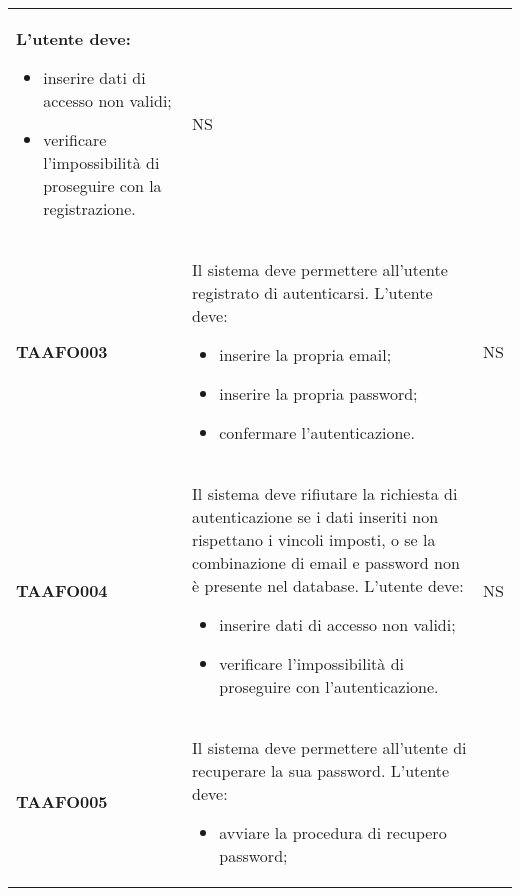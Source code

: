 \documentclass[../piano-di-qualifica.tex]{subfiles}
\begin{document}
\begin{longtable}[H]{>{\centering\bfseries}m{3cm} >{}m{11cm} >{\centering\arraybackslash}m{2cm}}
  L’utente deve:
  \begin{itemize}
    \item inserire dati di accesso non validi;
    \item verificare l'impossibilità di proseguire con la registrazione.
  \end{itemize}
                                  & NS                                                                                                                                                                                                                                   \\
  TAAFO003                        & Il sistema deve permettere all’utente registrato di autenticarsi. \newline
  L’utente deve:
  \begin{itemize}
    \item inserire la propria email;
    \item inserire la propria password;
    \item confermare l'autenticazione.
  \end{itemize}
                                  & NS                                                                                                                                                                                                                                   \\
  TAAFO004                        & Il sistema deve rifiutare la richiesta di autenticazione se i dati inseriti non rispettano i vincoli imposti, o se la combinazione di email e password non è presente nel database. \newline
  L’utente deve:
  \begin{itemize}
    \item inserire dati di accesso non validi;
    \item verificare l'impossibilità di proseguire con l'autenticazione.
  \end{itemize}
                                  & NS                                                                                                                                                                                                                                   \\
  TAAFO005                        & Il sistema deve permettere all’utente di recuperare la sua password. \newline
  L’utente deve:
  \begin{itemize}
    \item avviare la procedura di recupero password;

\end{itemize}
\end{longtable}
\end{document}
